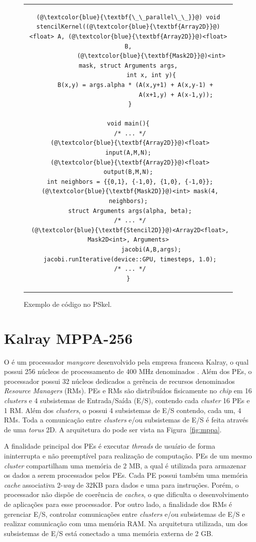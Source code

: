 \begin{figure}[thp] %
\centering          %
\begin{tabular}{c}

\begin{lstlisting}[]
(@\textcolor{blue}{\textbf{\_\_parallel\_\_}}@) void
stencilKernel((@\textcolor{blue}{\textbf{Array2D}}@)<float> A, (@\textcolor{blue}{\textbf{Array2D}}@)<float> B,
             (@\textcolor{blue}{\textbf{Mask2D}}@)<int> mask, struct Arguments args,
             int x, int y){
    B(x,y) = args.alpha * (A(x,y+1) + A(x,y-1) +
                           A(x+1,y) + A(x-1,y));
 }

void main(){
 /* ... */
 (@\textcolor{blue}{\textbf{Array2D}}@)<float> input(A,M,N);
 (@\textcolor{blue}{\textbf{Array2D}}@)<float> output(B,M,N);
 int neighbors = {{0,1}, {-1,0}, {1,0}, {-1,0}};
 (@\textcolor{blue}{\textbf{Mask2D}}@)<int> mask(4, neighbors);
 struct Arguments args(alpha, beta);
 /* ... */
 (@\textcolor{blue}{\textbf{Stencil2D}}@)<Array2D<float>, Mask2D<int>, Arguments>
             jacobi(A,B,args);
 jacobi.runIterative(device::GPU, timesteps, 1.0);
 /* ... */
}
\end{lstlisting}
\end{tabular}
\caption*{Exemplo de código no PSkel.}
\end{figure}


\section{Kalray MPPA-256}
O \mppa é um processador \textit{manycore} desenvolvido pela empresa francesa Kalray, o qual possui 256 núcleos de processamento de 400 MHz denominados \pes. Além dos PEs, o processador possui 32 núcleos dedicados a gerência de recursos denominados \textit{Resource Managers} (RMs). PEs e RMs são distribuídos fisicamente no \textit{chip} em 16 \textit{clusters} e 4 subsistemas de Entrada/Saída (E/S), contendo cada \textit{cluster} 16 PEs e 1 RM. Além dos \textit{clusters}, o \mppa possui 4 subsistemas de E/S contendo, cada um, 4 RMs. Toda a comunicação entre \textit{clusters} e/ou subsistemas de E/S é feita através de uma \noc \textit{torus} 2D. A arquitetura do \mppa pode ser vista na Figura~\ref{fig:mppa}.

A finalidade principal dos PEs é executar \textit{threads} de usuário de forma ininterrupta e não preemptível para realização de computação. PEs de um mesmo \textit{cluster} compartilham uma memória de 2 MB, a qual é utilizada para armazenar os dados a serem processados pelos PEs. Cada PE possui também uma memória \textit{cache} associativa 2-\textit{way} de 32KB para dados e uma para instruções. Porém, o processador não dispõe de coerência de \textit{caches}, o que dificulta o desenvolvimento de aplicações para esse processador. Por outro lado, a finalidade dos RMs é gerenciar E/S, controlar comunicações entre \textit{clusters} e/ou subsistemas de E/S e realizar comunicação com uma memória RAM. Na arquitetura utilizada, um dos subsistemas de E/S está conectado a uma memória externa \lpddr de 2 GB.

